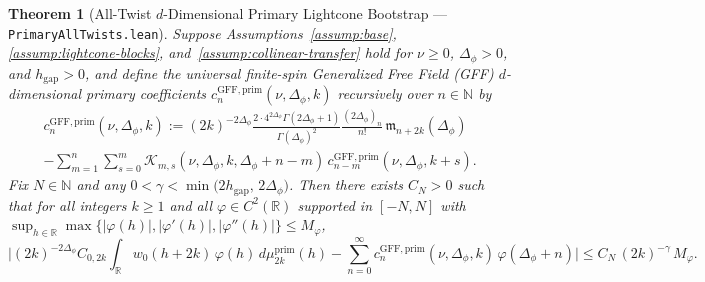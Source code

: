 \documentclass[10pt,a4paper]{article}
\newtheorem{theorem}{Theorem}
\theoremstyle{definition}
\begin{document}
\begin{theorem}[All-Twist $d$-Dimensional Primary Lightcone Bootstrap --- \texttt{PrimaryAllTwists.lean}]
\label{thm:all-twist-primary}
Suppose Assumptions~\ref{assump:base}, \ref{assump:lightcone-blocks}, and~\ref{assump:collinear-transfer} hold for $\nu \ge 0$, $\Delta_\phi > 0$, and $h_{\mathrm{gap}} > 0$, and define the universal finite-spin Generalized Free Field (GFF) $d$-dimensional primary coefficients $c^{\mathrm{GFF, prim}}_n(\nu, \Delta_\phi, k)$ recursively over $n \in \mathbb{N}$ by
\begin{multline}
  \label{eq:gff-prim-rec}
  c^{\mathrm{GFF, prim}}_n(\nu, \Delta_\phi, k) := (2k)^{-2\Delta_\phi} \frac{2 \cdot 4^{2\Delta_\phi} \Gamma(2\Delta_\phi + 1)}{\Gamma(\Delta_\phi)^2} \frac{(2\Delta_\phi)_n}{n!} \, \mathfrak{m}_{n + 2k}(\Delta_\phi) \\
  - \sum_{m=1}^{n} \sum_{s=0}^{m} \mathcal{K}_{m, s}(\nu, \Delta_\phi, k, \Delta_\phi + n - m) \, c^{\mathrm{GFF, prim}}_{n - m}(\nu, \Delta_\phi, k + s).
\end{multline}
Fix $N \in \mathbb{N}$ and any $0 < \gamma < \min\bigl(2 h_{\mathrm{gap}},\, 2\Delta_\phi\bigr)$. Then there exists $C_N > 0$ such that for all integers $k \ge 1$ and all $\varphi \in C^2(\mathbb{R})$ supported in $[-N, N]$ with $\sup_{h \in \mathbb{R}} \max\{|\varphi(h)|, |\varphi'(h)|, |\varphi''(h)|\} \le M_\varphi$,
\begin{equation}
  \label{eq:all-twist-primary}
  \Biggl|(2k)^{-2\Delta_\phi} C_{0, 2k} \int_{\mathbb{R}} w_0(h + 2k) \, \varphi(h) \, d\mu^{\mathrm{prim}}_{2k}(h)
    - \sum_{n=0}^{\infty} c^{\mathrm{GFF, prim}}_n(\nu, \Delta_\phi, k) \, \varphi(\Delta_\phi + n)\Biggr|
  \le C_N \, (2k)^{-\gamma} \, M_\varphi.
\end{equation}
\end{theorem}
\end{document}

